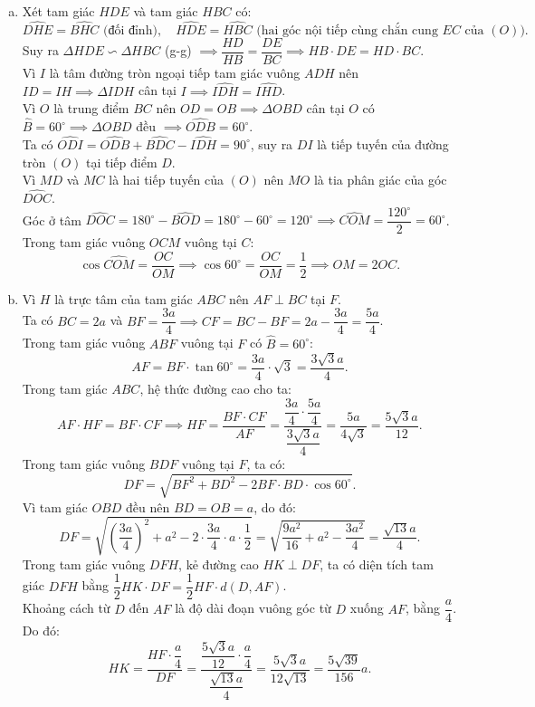 \begin{bt}
{\begin{enumerate}[a)]
	Tâm $I$ của đường tròn này là trung điểm của đoạn thẳng $AH$.
	\item Xét tam giác $HDE$ và tam giác $HBC$ có:
	$$ \widehat{DHE} = \widehat{BHC}\text{ (đối đỉnh)}, \quad \widehat{HDE} = \widehat{HBC}\text{ (hai góc nội tiếp cùng chắn cung } EC \text{ của } (O)). $$
	Suy ra $\Delta HDE \backsim \Delta HBC$ (g-g) $\implies \dfrac{HD}{HB} = \dfrac{DE}{BC} \implies HB \cdot DE = HD \cdot BC$.\\
	Vì $I$ là tâm đường tròn ngoại tiếp tam giác vuông $ADH$ nên $ID = IH \implies \Delta IDH$ cân tại $I \implies \widehat{IDH} = \widehat{IHD}$.\\
	Vì $O$ là trung điểm $BC$ nên $OD = OB \implies \Delta OBD$ cân tại $O$ có $\widehat{B} = 60^\circ \implies \Delta OBD$ đều $\implies \widehat{ODB} = 60^\circ$.\\
	Ta có $\widehat{ODI} = \widehat{ODB} + \widehat{BDC} - \widehat{IDH} = 90^\circ$, suy ra $DI$ là tiếp tuyến của đường tròn $(O)$ tại tiếp điểm $D$.\\
	Vì $MD$ và $MC$ là hai tiếp tuyến của $(O)$ nên $MO$ là tia phân giác của góc $\widehat{DOC}$.\\
	Góc ở tâm $\widehat{DOC} = 180^\circ - \widehat{BOD} = 180^\circ - 60^\circ = 120^\circ \implies \widehat{COM} = \dfrac{120^\circ}{2} = 60^\circ$.\\
	Trong tam giác vuông $OCM$ vuông tại $C$:
	$$ \cos \widehat{COM} = \dfrac{OC}{OM} \implies \cos 60^\circ = \dfrac{OC}{OM} = \dfrac{1}{2} \implies OM = 2OC. $$
	\item Vì $H$ là trực tâm của tam giác $ABC$ nên $AF \perp BC$ tại $F$.\\
	Ta có $BC = 2a$ và $BF = \dfrac{3a}{4} \implies CF = BC - BF = 2a - \dfrac{3a}{4} = \dfrac{5a}{4}$.\\
	Trong tam giác vuông $ABF$ vuông tại $F$ có $\widehat{B} = 60^\circ$:
	$$ AF = BF \cdot \tan 60^\circ = \dfrac{3a}{4} \cdot \sqrt{3} = \dfrac{3\sqrt{3}a}{4}. $$
	Trong tam giác $ABC$, hệ thức đường cao cho ta:
	$$ AF \cdot HF = BF \cdot CF \implies HF = \dfrac{BF \cdot CF}{AF} = \dfrac{\dfrac{3a}{4} \cdot \dfrac{5a}{4}}{\dfrac{3\sqrt{3}a}{4}} = \dfrac{5a}{4\sqrt{3}} = \dfrac{5\sqrt{3}a}{12}. $$
	Trong tam giác vuông $BDF$ vuông tại $F$, ta có:
	$$ DF = \sqrt{BF^2 + BD^2 - 2BF \cdot BD \cdot \cos 60^\circ}. $$
	Vì tam giác $OBD$ đều nên $BD = OB = a$, do đó:
	$$ DF = \sqrt{\left(\dfrac{3a}{4}\right)^2 + a^2 - 2 \cdot \dfrac{3a}{4} \cdot a \cdot \dfrac{1}{2}} = \sqrt{\dfrac{9a^2}{16} + a^2 - \dfrac{3a^2}{4}} = \dfrac{\sqrt{13}a}{4}. $$
	Trong tam giác vuông $DFH$, kẻ đường cao $HK \perp DF$, ta có diện tích tam giác $DFH$ bằng $\dfrac{1}{2}HK \cdot DF = \dfrac{1}{2}HF \cdot d(D, AF)$.\\
	Khoảng cách từ $D$ đến $AF$ là độ dài đoạn vuông góc từ $D$ xuống $AF$, bằng $\dfrac{a}{4}$.\\
	Do đó:
	$$ HK = \dfrac{HF \cdot \dfrac{a}{4}}{DF} = \dfrac{\dfrac{5\sqrt{3}a}{12} \cdot \dfrac{a}{4}}{\dfrac{\sqrt{13}a}{4}} = \dfrac{5\sqrt{3}a}{12\sqrt{13}} = \dfrac{5\sqrt{39}}{156}a. $$
\end{enumerate}
}
\end{bt}

